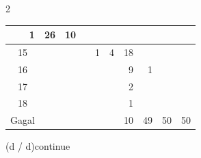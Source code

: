 \documentclass[12pt]{article}
\begin{document}
{\begin{multicols}{2}
{\begin{tabular}{|c|lllllllll|}
\multicolumn{1}{r|}{1} & \multicolumn{1}{r|}{26} & \multicolumn{1}{r|}{10} & \multicolumn{1}{r|}{} & \multicolumn{1}{r|}{} & \\ \hline 15 & \multicolumn{1}{r|}{} & \multicolumn{1}{r|}{} & \multicolumn{1}{r|}{} & \multicolumn{1}{r|}{1} & \multicolumn{1}{r|}{4} & \multicolumn{1}{r|}{18} & \multicolumn{1}{r|}{} & \multicolumn{1}{r|}{} & \\ \hline 16 & \multicolumn{1}{r|}{} & \multicolumn{1}{r|}{} & \multicolumn{1}{r|}{} & \multicolumn{1}{r|}{} & \multicolumn{1}{r|}{} & \multicolumn{1}{r|}{9} & \multicolumn{1}{r|}{1} & \multicolumn{1}{r|}{} & \\ \hline 17 & \multicolumn{1}{r|}{} & \multicolumn{1}{r|}{} & \multicolumn{1}{r|}{} & \multicolumn{1}{r|}{} & \multicolumn{1}{r|}{} & \multicolumn{1}{r|}{2} & \multicolumn{1}{r|}{} & \multicolumn{1}{r|}{} & \\ \hline 18 & \multicolumn{1}{r|}{} & \multicolumn{1}{r|}{} & \multicolumn{1}{r|}{} & \multicolumn{1}{r|}{} & \multicolumn{1}{r|}{} & \multicolumn{1}{r|}{1} & \multicolumn{1}{r|}{} & \multicolumn{1}{r|}{} & \\ \hline Gagal & \multicolumn{1}{r|}{} & \multicolumn{1}{r|}{} & \multicolumn{1}{r|}{} & \multicolumn{1}{r|}{} & \multicolumn{1}{r|}{} & \multicolumn{1}{r|}{10} & \multicolumn{1}{r|}{49} & \multicolumn{1}{r|}{50} & 50 \\ \hline
		\end{tabular}
	}
	\end{multicols}
}{(d / d)}{continue}
\end{document}
